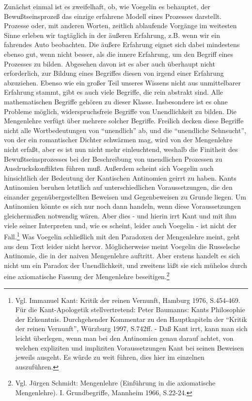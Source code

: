 Zunächst einmal ist es zweifelhaft, ob, wie Voegelin es behauptet, der
Bewußtseinsprozeß das einzige erfahrene Modell eines Prozesses
darstellt.  Prozesse oder, mit anderen Worten, zeitlich ablaufende
Vorgänge im weitesten Sinne erleben wir tagtäglich in der äußeren
Erfahrung, z.B. wenn wir ein fahrendes Auto beobachten. Die äußere
Erfahrung eignet sich dabei mindestens ebenso gut, wenn nicht besser,
als die innere Erfahrung, um den Begriff eines Prozesses zu bilden.
Abgesehen davon ist es aber auch überhaupt nicht erforderlich, zur
Bildung eines Begriffes diesen von irgend einer Erfahrung abzuziehen.
Ebenso wie ein großer Teil unseres Wissens nicht aus unmittelbarer
Erfahrung stammt, gibt es auch viele Begriffe, die rein abstrakt sind.
Alle mathematischen Begriffe gehören zu dieser Klasse. Insbesondere ist
es ohne Probleme möglich, widerspruchsfreie Begriffe von Unendlichkeit
zu bilden. Die Mengenlehre verfügt über mehrere solcher Begriffe.
Freilich decken diese Begriffe nicht alle Wortbedeutungen von
"`unendlich"' ab, und die "`unendliche Sehnsucht"', von der ein
romantischer Dichter schwärmen mag, wird von der Mengenlehre nicht
erfaßt, aber es ist nun nicht mehr einleuchtend, weshalb die Finitheit
des Bewußtseinsprozesses bei der Beschreibung von unendlichen Prozessen
zu Ausdruckskonflikten führen muß. Außerdem scheint sich Voegelin auch
hinsichtlich der Bedeutung der Kantischen Antinomien geirrt zu haben.
Kants Antinomien beruhen letztlich auf unterschiedlichen
Voraussetzungen, die den einander gegenübergestellten Beweisen und
Gegenbeweisen zu Grunde liegen.  Um Antinomien könnte es sich nur noch
dann handeln, wenn diese Voraussetzungen gleichermaßen notwendig wären.
Aber dies - und hierin irrt Kant und mit ihm viele seiner Interpreten
und, wie es scheint, leider auch Voegelin - ist nicht der
Fall.\footnote{Vgl. Immanuel Kant: Kritik der reinen Vernunft, Hamburg
  1976, S.454-469. Für die Kant-Apologetik stellvertretend: Peter
  Baumanns: Kants Philosophie der Erkenntnis. Durchgehender Kommentar zu
  den Hauptkapiteln der "`Kritik der reinen Vernunft"', Würzburg 1997,
  S.742ff. - Daß Kant irrt, kann man sich leicht überlegen, wenn man bei
  den Antinomien genau darauf achtet, von welchen expliziten und
  impliziten Voraussetzungen Kant bei seinen Beweisen jeweils ausgeht.
  Es würde zu weit führen, dies hier im einzelnen auszuführen.}  Was
Voegelin schließlich mit den Paradoxen der Mengenlehre meint, geht aus
dem Text leider nicht hervor.  Möglicherweise meint Voegelin die
Russelsche Antinomie, die in der naiven Mengenlehre auftritt.  Aber
erstens handelt es sich nicht um ein Paradox der Unendlichkeit, und
zweitens läßt sie sich mühelos durch eine axiomatische Fassung der
Mengenlehre beseitigen.\footnote{Vgl. Jürgen Schmidt: Mengenlehre
  (Einführung in die axiomatische Mengenlehre). I.  Grundbegriffe,
  Mannheim 1966, S.22-24.}

